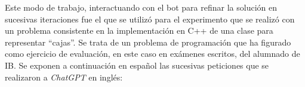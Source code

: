 \documentclass[twocolumn,twoside,a4paper, 10pt]{article}
\newcommand{\ChatGPT}{\textit{ChatGPT}{}}           %
\begin{document}

%
Este modo de trabajo, interactuando con el bot para refinar la solución en sucesivas iteraciones fue el que se
utilizó para el experimento que se realizó con un problema consistente en la implementación en C++ de una
clase para representar ``cajas''. 
Se trata de un problema de programación que ha figurado como ejercicio de evaluación, en este caso
en exámenes escritos, del alumnado de IB.
Se exponen a continuación en español las sucesivas peticiones que se realizaron a \ChatGPT{} en inglés:
\end{document}
